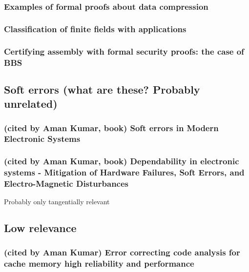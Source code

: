 \documentclass{article}
\begin{document}
\subsubsection{Examples of formal proofs about data compression}

\subsubsection{Classification of finite fields with applications}

\subsubsection{Certifying assembly with formal security proofs: the case of BBS}



\subsection{Soft errors (what are these? Probably unrelated)}

\subsubsection{(cited by Aman Kumar, book) Soft errors in Modern Electronic Systems}

\subsubsection{(cited by Aman Kumar, book) Dependability in electronic systems - Mitigation of Hardware Failures, Soft Errors, and Electro-Magnetic Disturbances}

Probably only tangentially relevant


\subsection{Low relevance}

\subsubsection{(cited by Aman Kumar) Error correcting code analysis for cache memory high reliability and performance}
\end{document}
